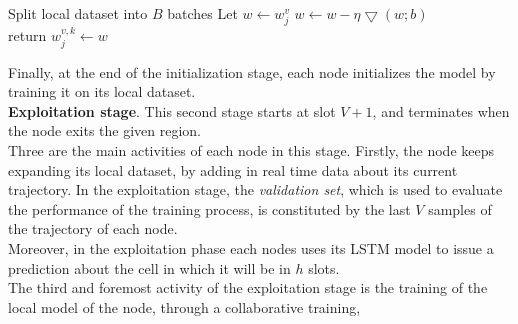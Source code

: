 \documentclass[conference]{IEEEtran}
\begin{document}
\begin{algorithm}
\small
\begin{algorithmic}
 
\State Split local dataset into $B$ batches
\State Let $w\gets w_j^v$
\State $w\gets w - \eta\bigtriangledown(w;b)$\\
\EndFor
\State return $w^{v,k}_j \gets w$ 
\EndFunction
\end{algorithmic}
\normalsize
\end{algorithm}
%
Finally, at the end of the initialization stage, each node initializes the model by training it on its local dataset. \\
\textbf{Exploitation stage}. This second stage starts at slot $V+1$, and terminates when the node exits the given region.\\
Three are the main activities of each node in this stage. Firstly, the node keeps expanding its local dataset, by adding in real time data about its current trajectory. In the exploitation stage, the \textit{validation set}, which is used to evaluate the performance of the training process, is constituted by the last $V$ samples of the trajectory of each node.\\
Moreover, in the exploitation phase each nodes uses its LSTM model to issue a prediction about the cell in which it will be in $h$ slots.\\%
The third and foremost activity of the exploitation stage is the training of the local model of the node, through a collaborative training, %
\end{document}
